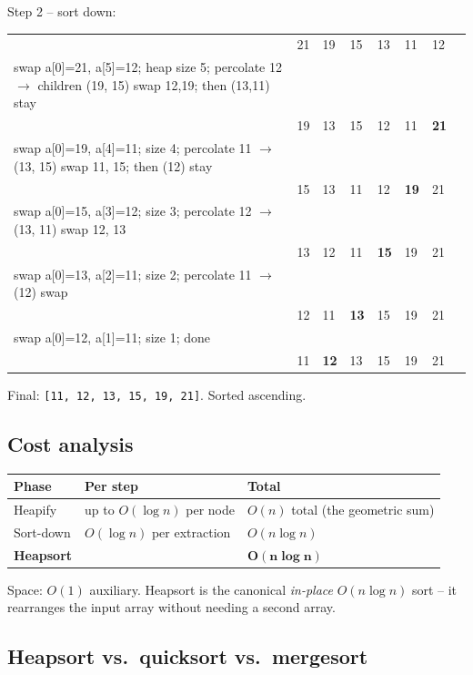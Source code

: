 \documentclass[11pt]{article}
\begin{document}
Step 2 -- sort down:

\begin{center}
\begin{tabular}{llllllll}
 & 21 & 19 & 15 & 13 & 11 & 12 \\
swap a[0]=21, a[5]=12; heap size 5; percolate 12 $\to$ children (19, 15) swap 12,19; then (13,11) stay \\
 & 19 & 13 & 15 & 12 & 11 & \textbf{21} \\
swap a[0]=19, a[4]=11; size 4; percolate 11 $\to$ (13, 15) swap 11, 15; then (12) stay \\
 & 15 & 13 & 11 & 12 & \textbf{19} & 21 \\
swap a[0]=15, a[3]=12; size 3; percolate 12 $\to$ (13, 11) swap 12, 13 \\
 & 13 & 12 & 11 & \textbf{15} & 19 & 21 \\
swap a[0]=13, a[2]=11; size 2; percolate 11 $\to$ (12) swap \\
 & 12 & 11 & \textbf{13} & 15 & 19 & 21 \\
swap a[0]=12, a[1]=11; size 1; done \\
 & 11 & \textbf{12} & 13 & 15 & 19 & 21 \\
\end{tabular}
\end{center}

Final: \texttt{[11, 12, 13, 15, 19, 21]}. Sorted ascending.

\subsection*{Cost analysis}

\begin{center}
\begin{tabular}{lll}
Phase & Per step & Total \\
\hline
Heapify              & up to $O(\log n)$ per node & $O(n)$ total (the geometric sum) \\
Sort-down            & $O(\log n)$ per extraction & $O(n \log n)$ \\
\hline
\textbf{Heapsort}    & & $\mathbf{O(n \log n)}$ \\
\end{tabular}
\end{center}

Space: $O(1)$ auxiliary. Heapsort is the canonical \emph{in-place} $O(n \log n)$ sort -- it rearranges the input array without needing a second array.

\subsection*{Heapsort vs.\ quicksort vs.\ mergesort}
\end{document}
